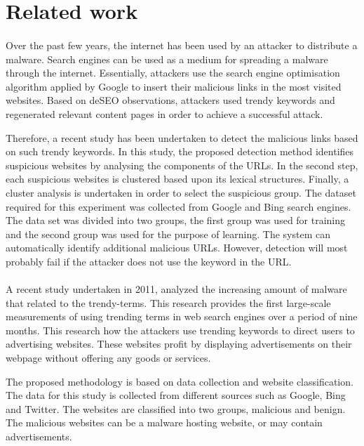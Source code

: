 \section{Related work}

\paragraph{} 
Over the past few years, the internet has been used by an attacker to distribute a malware. Search engines can be used as a medium for spreading a malware through the internet. Essentially, attackers use the search engine optimisation algorithm applied by Google to insert their malicious links in the most visited websites. Based on deSEO observations, attackers used trendy keywords and regenerated relevant content pages in order to achieve a successful attack\cite{deseo}.

Therefore, a recent study has been undertaken to detect the malicious links based on such trendy keywords. In this study, the proposed detection method identifies suspicious websites by analysing the components of the URLs. In the second step, each suspicious websites is clustered based upon its lexical structures. Finally, a cluster analysis is undertaken in order to select the suspicious group\cite{deseo}.
The dataset required for this experiment was collected from Google and Bing search engines. The data set was divided into two groups, the first group was used for training and the second group was used for the purpose of learning. The system can automatically identify additional malicious URLs. However, detection will most probably fail if the attacker does not use the keyword in the URL\cite{deseo}.

\paragraph{} 
A recent study undertaken in 2011, analyzed the increasing amount of malware that related to the trendy-terms. This research provides the first large-scale measurements of using trending terms in web search engines over a period of nine months. This research how the attackers use trending keywords to direct users to advertising websites. These websites profit by displaying advertisements on their webpage without offering any goods or services\cite{moore2011fashion}.

The proposed methodology is based on data collection and website classification. The data for this study is collected from different sources such as Google, Bing and Twitter. The websites are classified into two groups, malicious and benign. The malicious websites can be a malware hosting website, or may contain advertisements\cite{moore2011fashion}.

